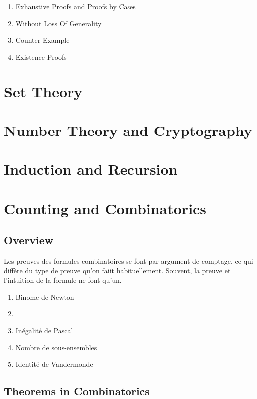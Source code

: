 \documentclass{article}
\begin{document}
    \begin{enumerate}
	\item Exhaustive Proofs and Proofs by Cases
	\item Without Loss Of Generality
	\item Counter-Example
	\item Existence Proofs
    \end{enumerate}


\section{Set Theory}

\section{Number Theory and Cryptography}

\section{Induction and Recursion}

\section{Counting and Combinatorics}

\subsection{Overview}%
\label{sub:Overview}

Les preuves des formules combinatoires se font par argument de comptage,
ce qui diffère du type de preuve qu'on faiit habituellement. Souvent,
la preuve et l'intuition de la formule ne font qu'un.

\begin{enumerate}
    \item Binome de Newton
    \item
    \item Inégalité de Pascal
    \item Nombre de sous-ensembles
    \item Identité de Vandermonde
\end{enumerate}

\subsection{Theorems in Combinatorics}%
\label{sub:Theorems in Combinatorics}
\end{document}
